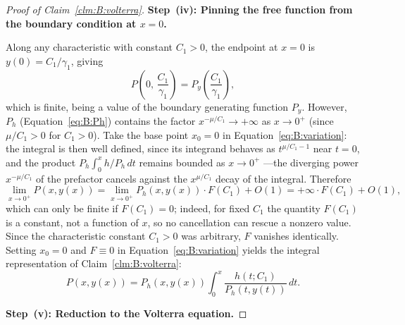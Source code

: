 \begin{proof}[Proof of Claim~\ref{clm:B:volterra}]
    \medskip\noindent\textbf{Step~(iv): Pinning the free function from the boundary condition at $x=0$.}
    
    Along any characteristic with constant $C_1>0$, the endpoint at $x=0$ is $y(0)=C_1/\gamma_1$, giving
    \begin{equation*}
        P\!\left(0,\,\frac{C_1}{\gamma_1}\right) = P_y\!\left(\frac{C_1}{\gamma_1}\right),
    \end{equation*}
    which is finite, being a value of the boundary generating function $P_y$.  However, $P_h$ (Equation~\eqref{eq:B:Ph}) contains the factor $x^{-\mu/C_1}\to+\infty$ as $x\to0^+$ (since $\mu/C_1>0$ for $C_1>0$). Take the base point $x_0=0$ in Equation~\eqref{eq:B:variation}: the integral is then well defined, since its integrand behaves as $t^{\mu/C_1-1}$ near $t=0$, and the product $P_h\int_0^x h/P_h\,dt$ remains bounded as $x\to0^+$ ---the diverging power $x^{-\mu/C_1}$ of the prefactor cancels against the $x^{\mu/C_1}$ decay of the integral. Therefore
    \begin{equation*}
        \lim_{x\to0^+}P(x,y(x))
        = \lim_{x\to0^+}P_h(x,y(x))\cdot F(C_1) + O(1)
        = +\infty\cdot F(C_1) + O(1),
    \end{equation*}
    which can only be finite if $F(C_1)=0$; indeed, for fixed $C_1$ the quantity $F(C_1)$ is a constant, not a function of $x$, so no cancellation can rescue a nonzero value. Since the characteristic constant $C_1>0$ was arbitrary, $F$ vanishes identically. Setting $x_0=0$ and $F\equiv0$ in Equation~\eqref{eq:B:variation} yields the integral representation of Claim~\ref{clm:B:volterra}:
    \begin{equation}
        P(x,y(x)) = P_h(x,y(x))\int_{0}^{x} \frac{h(t;C_1)}{P_h(t,y(t))}\,dt.
        \label{eq:B:integral_rep_body}
    \end{equation}
    
    \medskip\noindent\textbf{Step~(v): Reduction to the Volterra equation.}
    

\end{proof}
